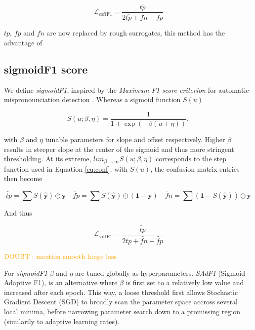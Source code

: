 \documentclass[sigconf,natbib,screen=true,review=true,anonymous]{acmart}
\newcommand\doubt[1]{\textcolor{orange}{DOUBT : #1}}
\begin{document}
\begin{equation}
\mathcal{L}_{\text {softF1}}= \frac{\overline{tp}}{2 \overline{tp}+ \overline{fn}+ \overline{fp}}
\end{equation}

\(tp\), \(fp\) and \(fn\) are now replaced by rough surrogates, this method has the advantage of 


\subsection{sigmoidF1 score}
\label{sec:org9aa10ed}

We define \emph{sigmoidF1}, inspired by the \emph{Maximum F1-score criterion} for automatic mispronounciation detection \cite{sigmoid}. Whereas a sigmoid function \(S(u)\)

\begin{equation}
S(u; \beta, \eta)=\frac{1}{1+\exp (-\beta (u + \eta))},
\end{equation}

with \(\beta\) and \(\eta\) tunable parameters for slope and offset respectively. Higher \(\beta\) results in steeper slope at the center of the sigmoid and thus more stringent thresholding. At its extreme, \(lim_{\beta\to\infty} S(u; \beta, \eta)\) corresponds to the step function used in Equation \ref{eq:conf}. with \(S(u)\), the confusion matrix entries then become

$$
\widetilde{tp}=\sum S(\hat{\mathbf{y}}) \odot \mathbf{y} \quad\widetilde{fp}= \sum S(\hat{\mathbf{y}}) \odot (\mathbf{1} - \mathbf{y}) \quad \widetilde{f n}= \sum (\mathbf{1} - S(\hat{\mathbf{y}})) \odot \mathbf{y}
$$

And thus

\begin{equation}
\mathcal{L}_{\text {softF1}}= \frac{\widetilde{tp}}{2 \widetilde{tp}+ \widetilde{fn}+ \widetilde{fp}}
\end{equation}

\doubt{mention smooth hinge loss} \cite{smoothHinge}

For \emph{sigmoidF1} \(\beta\) and \(\eta\) are tuned globally as hyperparameters. \emph{SAdF1} (Sigmoid Adaptive F1), is an alternative where \(\beta\) is first set to a relatively low value and increased after each epoch. This way, a loose threshold first allows Stochastic Gradient Descent (SGD) to broadly scan the parameter space accross several local minima, before narrowing parameter search down to a promissing region (similarily to adaptive learning rates).
\end{document}
